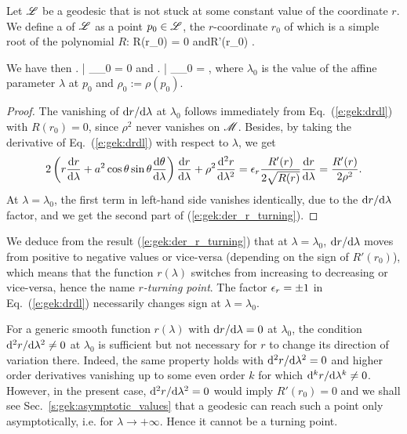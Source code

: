 Let $\mathscr{L}$ be a geodesic that is not stuck at some constant value of the
coordinate $r$.
We define a  of $\mathscr{L}$ as a point $p_0\in\mathscr{L}$, the $r$-coordinate $r_0$ of which is a simple root of the polynomial $R$:
\be \label{e:gek:def_r_turning}
    R(r_0) = 0 \quad\mbox{and}\quad R'(r_0)  .
\ee

We have then
\be \label{e:gek:der_r_turning}
   \left.  \right| _{\lambda_0} = 0
   \quad\mbox{and}\quad
   \left.  \right| _{\lambda_0} =   ,
\ee
where $\lambda_0$ is the value of the affine parameter $\lambda$ at $p_0$
and $\rho_0 := \rho(p_0)$.
\begin{proof}
The vanishing of $\mathrm{d} r/\mathrm{d}\lambda$ at $\lambda_0$ follows immediately
from Eq.~(\ref{e:gek:drdl}) with $R(r_0)=0$, since $\rho^2$ never vanishes
on $\mathscr{M}$. Besides, by
taking the derivative of Eq.~(\ref{e:gek:drdl}) with respect to $\lambda$, we
get
\[
    2 \left(r \frac{\mathrm{d} r}{\mathrm{d} \lambda} + a^2 \cos\theta\sin\theta \frac{\mathrm{d} \theta}{\mathrm{d} \lambda} \right)
    \frac{\mathrm{d} r}{\mathrm{d} \lambda} + \rho^2 \frac{\mathrm{d}^2 r}{\mathrm{d}\lambda^2} =
    \epsilon_r \frac{R'(r)}{2\sqrt{R(r)}} \frac{\mathrm{d} r}{\mathrm{d} \lambda} = \frac{R'(r)}{2\rho^2} .
\]
At $\lambda=\lambda_0$, the first term in left-hand side vanishes identically,
due to the $\mathrm{d} r/\mathrm{d}\lambda$ factor,
and we get the second part of (\ref{e:gek:der_r_turning}).
\end{proof}

We deduce from the result (\ref{e:gek:der_r_turning}) that at $\lambda=\lambda_0$,
$\mathrm{d} r/\mathrm{d}\lambda$ moves from positive to negative values or vice-versa
(depending on the sign of $R'(r_0)$), which means that the function $r(\lambda)$
switches from increasing to decreasing or vice-versa, hence the name
\emph{$r$-turning point}. The factor $\epsilon_r=\pm 1$ in Eq.~(\ref{e:gek:drdl}) necessarily
changes sign at $\lambda=\lambda_0$.

\begin{remark} \label{r:gek:der_r_analytic}
For a generic smooth function $r(\lambda)$ with $\mathrm{d} r/\mathrm{d} \lambda=0$ at
$\lambda_0$, the condition $\mathrm{d}^2 r/\mathrm{d}\lambda^2\neq 0$ at $\lambda_0$
is sufficient but not necessary for $r$ to change its direction of variation there.
Indeed, the same property holds with $\mathrm{d}^2 r/\mathrm{d}\lambda^2= 0$ and higher order derivatives vanishing up to some even order $k$ for which
$\mathrm{d}^k r/\mathrm{d}\lambda^k\neq 0$. However, in the present case,
$\mathrm{d}^2 r/\mathrm{d}\lambda^2=0$ would imply $R'(r_0)=0$ and we shall see
Sec.~\ref{s:gek:asymptotic_values} that a geodesic can reach such a point only asymptotically,
i.e. for $\lambda\to +\infty$. Hence it cannot be a turning point.
\end{remark}


